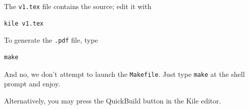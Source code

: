 \documentclass[11pt,a4paper,twoside,notitlepage]{article}
\begin{document}
The \texttt{v1.tex} file contains the source; edit it with
\begin{verbatim} 
kile v1.tex
\end{verbatim}

To generate the \texttt{.pdf} file, type
\begin{verbatim} 
make
\end{verbatim}

And no, we don't attempt to launch the \texttt{Makefile}. Just type \texttt{make} at the shell prompt and enjoy. 

Alternatively, you may press the QuickBuild button in the Kile editor.  


\end{document}
